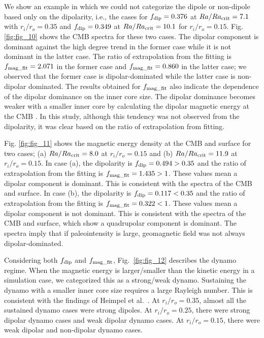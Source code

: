 We show an example in which we could not categorize the dipole or non-dipole based only on the dipolarity, i.e., the cases for $f_{\rm dip} = 0.376$ at $Ra/Ra_{\rm crit} = 7.1$ with $r_i/r_o = 0.35$ and $f_{\rm dip} = 0.349$ at $Ra/Ra_{\rm crit} = 10.1$ for $r_i/r_o = 0.15$. 
Fig. \ref{fig:fig_10} shows the CMB spectra for these two cases. 
The dipolar component is dominant against the high degree trend in the former case while it is not dominant in the latter case. 
The ratio of extrapolation from the fitting is $f_{\rm mag\_fit} = 2.071$ in the former case and $f_{\rm mag\_fit} = 0.860$ in the latter case; we observed that the former case is dipolar-dominated while the latter case is non-dipolar dominated. 
The results obtained for $f_{\rm mag\_fit}$  also indicate the dependence of the dipolar dominance on the inner core size. 
The dipolar dominance becomes weaker with a smaller inner core by calculating the dipolar magnetic energy at the CMB \cite{Heimpel:2005}. 
In this study, although this tendency was not observed from the dipolarity, it was clear based on the ratio of extrapolation from fitting.

{\color{red}
Fig. \ref{fig:fig_11} shows the magnetic energy density at the CMB and surface for two cases; (a) $Ra/Ra_{\rm crit} = 8.0$ at $r_i/r_o = 0.15$ and (b) $Ra/Ra_{\rm crit} = 11.9$ at $r_i/r_o = 0.15$. 
In case (a), the dipolarity is $f_{\rm dip} = 0.494 > 0.35$ and the ratio of extrapolation from the fitting is $f_{\rm mag\_fit} = 1.435 > 1$. 
These values mean a dipolar component is dominant. 
This is consistent with the spectra of the CMB and surface. 
In case (b), the dipolarity is $f_{\rm dip} = 0.117 < 0.35$ and the ratio of extrapolation from the fitting is $f_{\rm mag\_fit} = 0.322 < 1$. 
These values mean a dipolar component is not dominant. 
This is consistent with the spectra of the CMB and surface, which show a quadrupolar component is dominant. 
The spectra imply that if paleointensity is large, geomagnetic field was not always dipolar-dominated.}

Considering both $f_{\rm dip}$ and $f_{\rm mag\_fit}$, Fig.~{\color{red}\ref{fig:fig_12}
} describes the dynamo regime. 
When the magnetic energy is larger/smaller than the kinetic energy in a simulation case, we categorized this as a strong/weak dynamo. 
Sustaining the dynamo with a smaller inner core size requires a large Rayleigh number. 
This is consistent with the findings of Heimpel et al.\ . 
At $r_i/r_o = 0.35$, almost all the sustained dynamo cases were strong dipoles. 
At $r_i/r_o = 0.25$, there were strong dipolar dynamo cases and weak dipolar dynamo cases. 
At $r_i/r_o = 0.15$, there were weak dipolar and non-dipolar dynamo cases.

